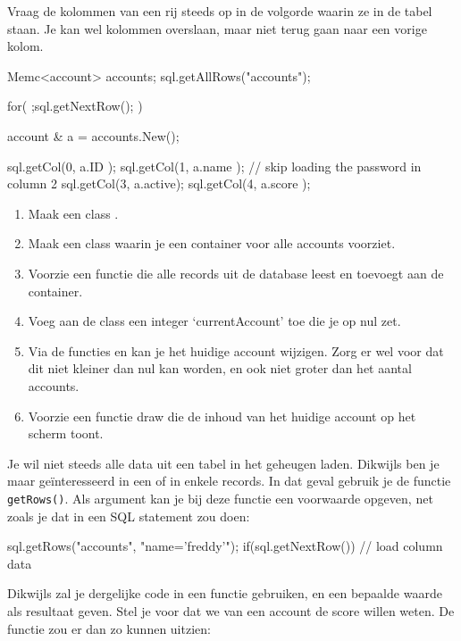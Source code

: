 \begin{note}
Vraag de kolommen van een rij steeds op in de volgorde waarin ze in de tabel staan. Je kan wel kolommen overslaan, maar niet terug gaan naar een vorige kolom.
\end{note}

\begin{code}
Memc<account> accounts;
sql.getAllRows("accounts");

for( ;sql.getNextRow(); ) {
  account & a = accounts.New();
	
	sql.getCol(0, a.ID    );
	sql.getCol(1, a.name  );
	// skip loading the password in column 2
	sql.getCol(3, a.active);
	sql.getCol(4, a.score );
}
\end{code}

\begin{exercise}
	\begin{enumerate}
		\item Maak een class .
		\item Maak een class  waarin je een container voor alle accounts voorziet. 
		\item Voorzie een functie  die alle records uit de database leest en toevoegt aan de container. 
		\item Voeg aan de class een integer `currentAccount' toe die je op nul zet. 
		\item Via de functies  en  kan je het huidige account wijzigen. Zorg er wel voor dat dit niet kleiner dan nul kan worden, en ook niet groter dan het aantal accounts.
		\item Voorzie een functie draw die de inhoud van het huidige account op het scherm toont.
	\end{enumerate}
\end{exercise}

Je wil niet steeds alle data uit een tabel in het geheugen laden. Dikwijls ben je maar ge\"interesseerd in een of in enkele records. In dat geval gebruik je de functie \texttt{getRows()}. Als argument kan je bij deze functie een voorwaarde opgeven, net zoals je dat in een SQL statement zou doen:

\begin{code}
sql.getRows("accounts", "name='freddy'");
if(sql.getNextRow()) {
	// load column data
}
\end{code}

Dikwijls zal je dergelijke code in een functie gebruiken, en een bepaalde waarde als resultaat geven. Stel je voor dat we van een account de score willen weten. De functie zou er dan zo kunnen uitzien:

